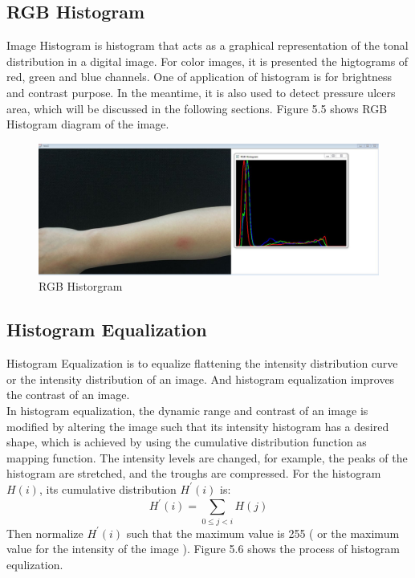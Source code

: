 \subsection{RGB Histogram}
Image Histogram is histogram  that acts as a graphical representation of the tonal distribution in a digital image.\cite{Sutton} For color images, it is presented the higtograms of red, green and blue channels. One of application of histogram is for brightness and contrast purpose. In the meantime, it is also used to detect pressure ulcers area, which will be discussed in the following sections. Figure 5.5 shows RGB Histogram diagram of the image.
\begin{figure}[h!]
	\centering
	\includegraphics[scale=0.39]{img/rgbhistorgram}
	\caption{RGB Historgram}
\end{figure}

\newpage
\subsection{Histogram Equalization}
Histogram Equalization is to equalize flattening the intensity distribution curve or the intensity distribution of an image. And histogram equalization improves the contrast of an image. \\

In histogram equalization\cite{Gonzalez}, the dynamic range and contrast of an image is modified by altering the image such that its intensity histogram has a desired shape, which is achieved by using the cumulative distribution function as mapping function. The intensity levels are changed, for example, the peaks of the histogram are stretched, and the troughs are compressed. For the histogram $H(i)$, its cumulative distribution $H^{'}(i)$ is:
\begin{displaymath}
H^{'}(i)  = \sum_{0\leq j< i}^{} H(j)
\end{displaymath}
Then normalize $H^{'}(i)$ such that the maximum value is 255 ( or the maximum value for the intensity of the image ). Figure 5.6 shows the process of histogram equlization.

